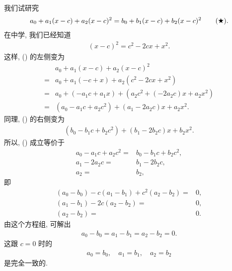 \begin{example}
    我们试研究
    \begin{align*}
        a_0 + a_1 (x - c) + a_2 (x - c)^2 = b_0 + b_1 (x - c) + b_2 (x - c)^2 \tag*{(\ding{72})}.
    \end{align*}
    在中学, 我们已经知道
    \begin{align*}
        (x - c)^2 = c^2 - 2cx + x^2.
    \end{align*}
    这样, () 的左侧变为
    \begin{align*}
             & a_0 + a_1 (x - c) + a_2 (x - c)^2                          \\
        = {} & a_0 + a_1 (-c + x) + a_2 (c^2 - 2cx + x^2)                 \\
        = {} & a_0 + (-a_1 c + a_1 x) + (a_2 c^2 + (-2a_2 c) x + a_2 x^2) \\
        = {} & (a_0 - a_1 c + a_2 c^2) + (a_1 -2a_2 c) x + a_2 x^2.
    \end{align*}
    同理, () 的右侧变为
    \begin{align*}
        (b_0 - b_1 c + b_2 c^2) + (b_1 -2b_2 c) x + b_2 x^2.
    \end{align*}
    所以, () 成立等价于
    \begin{align*}
        a_0 - a_1 c + a_2 c^2 = {} & b_0 - b_1 c + b_2 c^2, \\
        a_1 -2a_2 c           = {} & b_1 -2b_2 c,           \\
        a_2                   = {} & b_2,
    \end{align*}
    即
    \begin{align*}
        (a_0 - b_0) - c(a_1 - b_1) + c^2(a_2 - b_2) = {} & 0, \\
        (a_1 - b_1) - 2c(a_2 - b_2)                 = {} & 0, \\
        (a_2 - b_2)                                 = {} & 0.
    \end{align*}
    由这个方程组, 可解出
    \begin{align*}
        a_0 - b_0 = a_1 - b_1 = a_2 - b_2 = 0.
    \end{align*}
    这跟 $c = 0$ 时的
    \begin{align*}
        a_0 = b_0, \quad a_1 = b_1, \quad a_2 = b_2
    \end{align*}
    是完全一致的.
\end{example}

